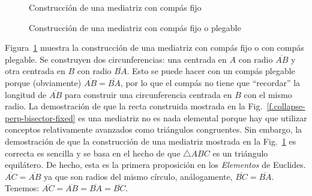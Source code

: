 \begin{figure}[t]
\begin{minipage}{.45\textwidth}
\begin{center}
\caption{Construcción de una mediatriz con compás fijo}\label{f.collapse-perp-bisector-fixed}
\end{center}
\end{minipage}
\hfill
\begin{minipage}{.45\textwidth}
\begin{center}
\caption{Construcción de una mediatriz con compás fijo o plegable}\label{f.collapse-perp-bisector-collapse}
\end{center}
\end{minipage}
\end{figure}

Figura~\ref{f.collapse-perp-bisector-collapse} muestra la construcción de una mediatriz con compás fijo o con compás plegable. Se construyen dos circunferencias: una centrada en $A$ con radio $\overline{AB}$ y otra centrada en $B$ con radio $\overline{BA}$. Esto se puede hacer con un compás plegable porque (obviamente) $\overline{AB}=\overline{BA}$, por lo que el compás no tiene que ``recordar'' la longitud de $\overline{AB}$ para construir una circunferencia centrada en $B$ con el mismo radio.
La demostración de que la recta construida mostrada en la Fig.~\ref{f.collapse-perp-bisector-fixed} es una mediatriz no es nada elemental porque hay que utilizar conceptos relativamente avanzados como triángulos congruentes. Sin embargo, la demostración de que la construcción de una mediatriz mostrada en la Fig.~\ref{f.collapse-perp-bisector-collapse} es correcta es sencilla y se basa en el hecho de que $\triangle ABC$ es un triángulo equilátero. De hecho, esta es la primera proposición en los \textit{Elementos} de Euclides.
$\overline{AC}=\overline{AB}$ ya que son radios del mismo círculo, análogamente, $\overline{BC}=\overline{BA}$. Tenemos: $\overline{AC}=\overline{AB}=\overline{BA}=\overline{BC}$.

